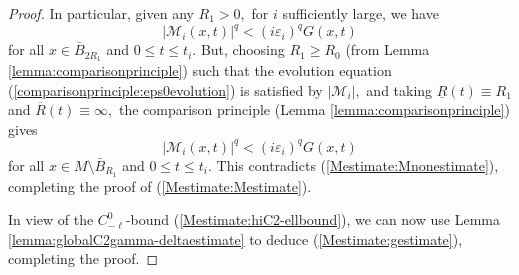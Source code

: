 \documentclass[12pt]{amsart}
\newcommand{\calM}{\mathcal{M}}
\renewcommand{\1}{{\mathbf 1}}
\newcommand{\eps}{{\varepsilon}}
\theoremstyle{others}
\numberwithin{equation}{section}
\begin{document}
\begin{proof}
In particular, given any $R_1 > 0,$ for $i$ sufficiently large, we have
\begin{equation}
| \calM_i(x,t) |^q < (i \eps_i)^q G(x,t)
\end{equation}
for all $x \in \bar{B}_{2R_1}$ and $0 \leq t \leq t_i.$ But, choosing $R_1 \geq R_0$ (from Lemma \ref{lemma:comparisonprinciple}) such that the evolution equation (\ref{comparisonprinciple:eps0evolution}) is satisfied by $|\calM_i|,$ and taking $\underline{R}(t) \equiv R_1$ and $\overline{R}(t) \equiv \infty,$ the comparison principle (Lemma \ref{lemma:comparisonprinciple}) gives
\begin{equation}
| \calM_i(x,t) |^q < (i \eps_i)^q G(x,t)
\end{equation}
for all $x \in M \setminus \bar{B}_{R_1}$ and $0 \leq t \leq t_i.$ This contradicts (\ref{Mestimate:Mnonestimate}), completing the proof of (\ref{Mestimate:Mestimate}).


In view of the $C^0_{-\ell}$-bound (\ref{Mestimate:hiC2-ellbound}), we can now use Lemma \ref{lemma:globalC2gamma-deltaestimate} to deduce (\ref{Mestimate:gestimate}), completing the proof.
\end{proof}
    
\end{document}
